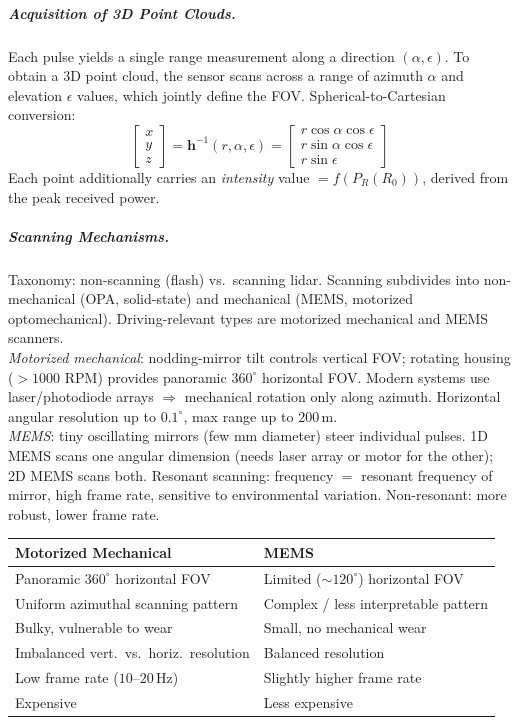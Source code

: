 \documentclass{article}
\begin{document}
\subparagraph{Acquisition of 3D Point Clouds.}
Each pulse yields a single range measurement along a direction $(\alpha, \epsilon)$. To obtain a 3D point cloud, the sensor scans across a range of azimuth $\alpha$ and elevation $\epsilon$ values, which jointly define the FOV. Spherical-to-Cartesian conversion:
\begin{equation*}
    \begin{bmatrix} x \\ y \\ z \end{bmatrix}
    = \mathbf{h}^{-1}(r, \alpha, \epsilon)
    = \begin{bmatrix} r \cos\alpha \cos\epsilon \\ r \sin\alpha \cos\epsilon \\ r \sin\epsilon \end{bmatrix}
\end{equation*}
Each point additionally carries an \textit{intensity} value $= f(P_R(R_0))$, derived from the peak received power.
 
\subparagraph{Scanning Mechanisms.}
Taxonomy: non-scanning (flash) vs.\ scanning lidar. Scanning subdivides into non-mechanical (OPA, solid-state) and mechanical (MEMS, motorized optomechanical). Driving-relevant types are motorized mechanical and MEMS scanners.\\
 
\textit{Motorized mechanical}: nodding-mirror tilt controls vertical FOV; rotating housing ($>1000$ RPM) provides panoramic $360^\circ$ horizontal FOV. Modern systems use laser/photodiode arrays $\Rightarrow$ mechanical rotation only along azimuth. Horizontal angular resolution up to $0.1^\circ$, max range up to $200$\,m. \\
 
\textit{MEMS}: tiny oscillating mirrors (few mm diameter) steer individual pulses. 1D MEMS scans one angular dimension (needs laser array or motor for the other); 2D MEMS scans both. Resonant scanning: frequency $=$ resonant frequency of mirror, high frame rate, sensitive to environmental variation. Non-resonant: more robust, lower frame rate.
 
\begin{center}
\begin{tabular}{l|l}
    \textbf{Motorized Mechanical} & \textbf{MEMS} \\ \hline
    Panoramic $360^\circ$ horizontal FOV & Limited ($\sim 120^\circ$) horizontal FOV \\
    Uniform azimuthal scanning pattern & Complex / less interpretable pattern \\
    Bulky, vulnerable to wear & Small, no mechanical wear \\
    Imbalanced vert.\ vs.\ horiz.\ resolution & Balanced resolution \\
    Low frame rate ($10$--$20$\,Hz) & Slightly higher frame rate \\
    Expensive & Less expensive \\
\end{tabular}
\end{center}
 
\end{document}
